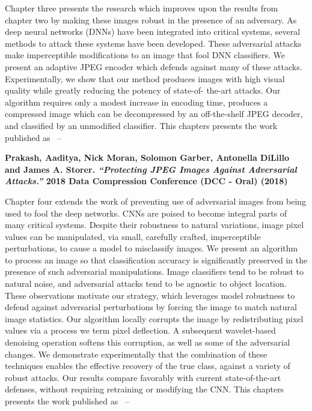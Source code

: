 Chapter three presents the research which improves upon the results from chapter two by making these images robust in the presence of an adversary.
As deep neural networks (DNNs) have been integrated into critical systems, several methods to attack these systems have been developed. These adversarial attacks make imperceptible modifications to an image that fool DNN classifiers. We present an adaptive JPEG encoder which defends against many of these attacks. Experimentally, we show that our method produces images with high visual quality while greatly reducing the potency of state-of- the-art attacks. Our algorithm requires only a modest increase in encoding time, produces a compressed image which can be decompressed by an off-the-shelf JPEG decoder, and classified by an unmodified classifier.
This chapters presents the work published as ~\cite{Prakash2018ProtectingJI}--

\noindent\textbf{
Prakash, Aaditya, Nick Moran, Solomon Garber, Antonella DiLillo and James A. Storer. \textit{``Protecting JPEG Images Against Adversarial Attacks.''} 2018 Data Compression Conference (DCC - Oral) (2018)
}
\vspace{2em}

Chapter four extends the work of preventing use of adversarial images from being used to fool the deep networks.
CNNs are poised to become integral parts of many critical systems. Despite their robustness to natural variations, image pixel values can be manipulated, via small, carefully crafted, imperceptible perturbations, to cause a model to misclassify images. We present an algorithm to process an image so that classification accuracy is significantly preserved in the presence of such adversarial manipulations. Image classifiers tend to be robust to natural noise, and adversarial attacks tend to be agnostic to object location. These observations motivate our strategy, which leverages model robustness to defend against adversarial perturbations by forcing the image to match natural image statistics. Our algorithm locally corrupts the image by redistributing pixel values via a process we term pixel deflection. A subsequent wavelet-based denoising operation softens this corruption, as well as some of the adversarial changes. We demonstrate experimentally that the combination of these techniques enables the effective recovery of the true class, against a variety of robust attacks. Our results compare favorably with current state-of-the-art defenses, without requiring retraining or modifying the CNN.
This chapters presents the work published as ~\cite{aadityaprakash2018}--

